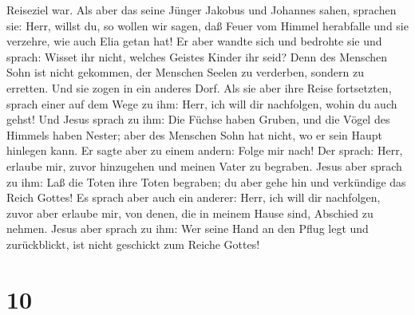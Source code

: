 Reiseziel war.  Als aber das seine Jünger Jakobus und
Johannes sahen, sprachen sie: Herr, willst du, so wollen wir sagen, daß
Feuer vom Himmel herabfalle und sie verzehre, wie auch Elia getan hat!
 Er aber wandte sich und bedrohte sie und sprach: Wisset
ihr nicht, welches Geistes Kinder ihr seid?  Denn des
Menschen Sohn ist nicht gekommen, der Menschen Seelen zu verderben,
sondern zu erretten. Und sie zogen in ein anderes Dorf. 
Als sie aber ihre Reise fortsetzten, sprach einer auf dem Wege zu ihm:
Herr, ich will dir nachfolgen, wohin du auch gehst!  Und
Jesus sprach zu ihm: Die Füchse haben Gruben, und die Vögel des Himmels
haben Nester; aber des Menschen Sohn hat nicht, wo er sein Haupt
hinlegen kann.  Er sagte aber zu einem andern: Folge mir
nach! Der sprach: Herr, erlaube mir, zuvor hinzugehen und meinen Vater
zu begraben.  Jesus aber sprach zu ihm: Laß die Toten
ihre Toten begraben; du aber gehe hin und verkündige das Reich Gottes!
 Es sprach aber auch ein anderer: Herr, ich will dir
nachfolgen, zuvor aber erlaube mir, von denen, die in meinem Hause sind,
Abschied zu nehmen.  Jesus aber sprach zu ihm: Wer seine
Hand an den Pflug legt und zurückblickt, ist nicht geschickt zum Reiche
Gottes!

\hypertarget{section-9}{%
\section{10}\label{section-9}}

